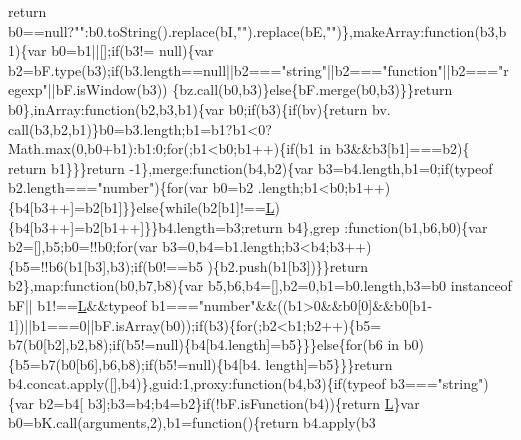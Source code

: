 \begin{DoxyCode}
{      return} b0==null?\textcolor{stringliteral}{""}:b0.toString().replace(bI,\textcolor{stringliteral}{""}).replace(bE,\textcolor{stringliteral}{""})\},makeArray:\textcolor{keyword}{function}(b3,b1)\{var b0=b1||[];\textcolor{keywordflow}{if}(b3!=
      null)\{var b2=bF.type(b3);\textcolor{keywordflow}{if}(b3.length==null||b2===\textcolor{stringliteral}{"string"}||b2===\textcolor{stringliteral}{"function"}||b2===\textcolor{stringliteral}{"regexp"}||bF.isWindow(b3))
      \{bz.call(b0,b3)\}\textcolor{keywordflow}{else}\{bF.merge(b0,b3)\}\}\textcolor{keywordflow}{return} b0\},inArray:\textcolor{keyword}{function}(b2,b3,b1)\{var b0;\textcolor{keywordflow}{if}(b3)\{\textcolor{keywordflow}{if}(bv)\{\textcolor{keywordflow}{return} bv.
      call(b3,b2,b1)\}b0=b3.length;b1=b1?b1<0?Math.max(0,b0+b1):b1:0;\textcolor{keywordflow}{for}(;b1<b0;b1++)\{\textcolor{keywordflow}{if}(b1 in b3&&b3[b1]===b2)\{\textcolor{keywordflow}{
      return} b1\}\}\}\textcolor{keywordflow}{return} -1\},merge:\textcolor{keyword}{function}(b4,b2)\{var b3=b4.length,b1=0;\textcolor{keywordflow}{if}(typeof b2.length===\textcolor{stringliteral}{"number"})\{\textcolor{keywordflow}{for}(var b0=b2
      .length;b1<b0;b1++)\{b4[b3++]=b2[b1]\}\}\textcolor{keywordflow}{else}\{\textcolor{keywordflow}{while}(b2[b1]!==\hyperlink{jquery_8js_a38ee4c0b5f4fe2a18d0c783af540d253}{L})\{b4[b3++]=b2[b1++]\}\}b4.length=b3;\textcolor{keywordflow}{return} b4\},grep
      :\textcolor{keyword}{function}(b1,b6,b0)\{var b2=[],b5;b0=!!b0;\textcolor{keywordflow}{for}(var b3=0,b4=b1.length;b3<b4;b3++)\{b5=!!b6(b1[b3],b3);\textcolor{keywordflow}{if}(b0!==b5
      )\{b2.push(b1[b3])\}\}\textcolor{keywordflow}{return} b2\},map:\textcolor{keyword}{function}(b0,b7,b8)\{var b5,b6,b4=[],b2=0,b1=b0.length,b3=b0 instanceof bF||
      b1!==\hyperlink{jquery_8js_a38ee4c0b5f4fe2a18d0c783af540d253}{L}&&typeof b1===\textcolor{stringliteral}{"number"}&&((b1>0&&b0[0]&&b0[b1-1])||b1===0||bF.isArray(b0));\textcolor{keywordflow}{if}(b3)\{\textcolor{keywordflow}{for}(;b2<b1;b2++)\{b5=
      b7(b0[b2],b2,b8);\textcolor{keywordflow}{if}(b5!=null)\{b4[b4.length]=b5\}\}\}\textcolor{keywordflow}{else}\{\textcolor{keywordflow}{for}(b6 in b0)\{b5=b7(b0[b6],b6,b8);\textcolor{keywordflow}{if}(b5!=null)\{b4[b4.
      length]=b5\}\}\}\textcolor{keywordflow}{return} b4.concat.apply([],b4)\},guid:1,proxy:\textcolor{keyword}{function}(b4,b3)\{\textcolor{keywordflow}{if}(typeof b3===\textcolor{stringliteral}{"string"})\{var b2=b4[
      b3];b3=b4;b4=b2\}\textcolor{keywordflow}{if}(!bF.isFunction(b4))\{\textcolor{keywordflow}{return} \hyperlink{jquery_8js_a38ee4c0b5f4fe2a18d0c783af540d253}{L}\}var b0=bK.call(arguments,2),b1=\textcolor{keyword}{function}()\{\textcolor{keywordflow}{return} b4.apply(b3

\end{DoxyCode}

